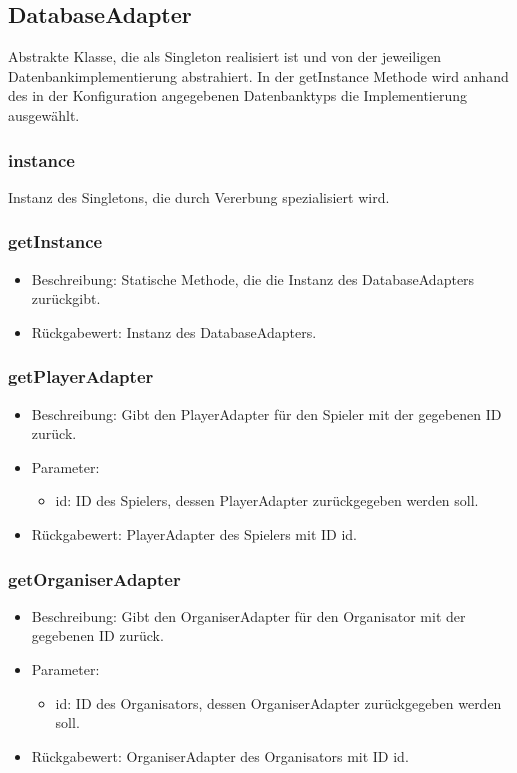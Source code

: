\documentclass[a4paper]{scrreprt}
\begin{document}
	\subsection{DatabaseAdapter}
	Abstrakte Klasse, die als Singleton realisiert ist und von der jeweiligen Datenbankimplementierung abstrahiert.
	In der getInstance Methode wird anhand des in der Konfiguration angegebenen Datenbanktyps die Implementierung ausgewählt.

	\subsubsection{instance}
	Instanz des Singletons, die durch Vererbung spezialisiert wird.

	\subsubsection{getInstance}
	\begin{itemize}
		\item Beschreibung: Statische Methode, die die Instanz des DatabaseAdapters zurückgibt.
		\item Rückgabewert: Instanz des DatabaseAdapters.
	\end{itemize}

	\subsubsection{getPlayerAdapter}
	\begin{itemize}
		\item Beschreibung: Gibt den PlayerAdapter für den Spieler mit der gegebenen ID zurück.
		\item Parameter:
		\begin{itemize}
			\item id: ID des Spielers, dessen PlayerAdapter zurückgegeben werden soll.
		\end{itemize}
		\item Rückgabewert: PlayerAdapter des Spielers mit ID id.
	\end{itemize}

	\subsubsection{getOrganiserAdapter}
	\begin{itemize}
		\item Beschreibung: Gibt den OrganiserAdapter für den Organisator mit der gegebenen ID zurück.
		\item Parameter:
		\begin{itemize}
			\item id: ID des Organisators, dessen OrganiserAdapter zurückgegeben werden soll.
		\end{itemize}
		\item Rückgabewert: OrganiserAdapter des Organisators mit ID id.
	\end{itemize}
\end{document}
